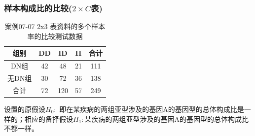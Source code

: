 \documentclass[
]{article}
\begin{document}
\hypertarget{ux6837ux672cux6784ux6210ux6bd4ux7684ux6bd4ux8f832-times-cux8868}{%
\subsubsection{\texorpdfstring{样本构成比的比较(\(2 \times C\)表)}{样本构成比的比较(2 \textbackslash times C表)}}\label{ux6837ux672cux6784ux6210ux6bd4ux7684ux6bd4ux8f832-times-cux8868}}

\begin{table}

\caption{\label{tab:chisqtab5}案例07-07 2x3 表资料的多个样本率的比较测试数据}
\centering
\begin{tabular}[t]{ccccc}
\toprule
组别 & DD & ID & II & 合计\\
\midrule
DN组 & 42 & 48 & 21 & 111\\
无DN组 & 30 & 72 & 36 & 138\\
合计 & 72 & 120 & 57 & 249\\
\bottomrule
\end{tabular}
\end{table}

设置的原假设\(H_0:\) 即在某疾病的两组亚型涉及的基因A的基因型的总体构成比是一样的；相应的备择假设\(H_1:\)某疾病的两组亚型涉及的基因A的基因型的总体构成比不都一样。
\end{document}
